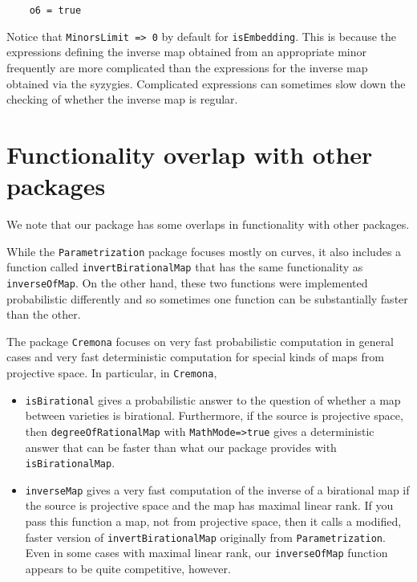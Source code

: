 \documentclass[11pt]{amsart}%
\numberwithin{equation}{theorem}
\renewcommand{\:}{\colon}
\theoremstyle{theorem}
\begin{document}
{{\begin{verbatim}
    o6 = true    
\end{verbatim}
}
{\color{black}\normalsize%
\noindent
Notice that {\tt MinorsLimit => 0} by default for {\tt isEmbedding}.  This is because the expressions defining the inverse map obtained from
an appropriate minor frequently are more complicated than the expressions for the inverse map obtained via the syzygies.  Complicated expressions can sometimes slow down the checking of whether the inverse map is regular.

\section{Functionality overlap with other packages}

We note that our package has some overlaps in functionality with other packages.

While the {\tt Parametrization} package \cite{ParametrizationPackage} focuses mostly on curves, it also includes a function called {\tt invertBirationalMap} that has the same functionality as {\tt inverseOfMap}. On the other hand, these two functions were implemented probabilistic differently and so sometimes one function can be substantially faster than the other.

The package {\tt Cremona} \cite{CremonaSource,CremonaArticle} focuses on very fast probabilistic computation in general cases and very fast deterministic computation for special kinds of maps from projective space. In particular, in {\tt Cremona},

\begin{itemize}
\item{}     {\tt isBirational} gives a probabilistic answer to the question of whether a map between varieties is birational. Furthermore, if the source is projective space, then {\tt degreeOfRationalMap} with {\tt MathMode=>true}  gives a deterministic answer that can be faster than what our package  provides with {\tt isBirationalMap}.
\item{}  {\tt inverseMap} gives a very fast computation of the inverse of a birational map if the source is projective space and the map has maximal linear rank. If you pass this function a map, not from projective space, then it calls a modified, faster version of {\tt invertBirationalMap} originally from {\tt Parametrization}. Even in some cases with maximal linear rank, our {\tt inverseOfMap} function appears to be quite competitive, however.
\end{itemize}

}}
\end{document}

